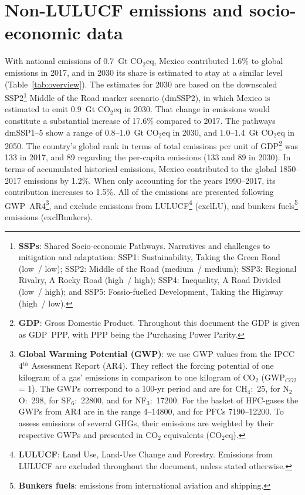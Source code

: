 \documentclass[12pt]{article}
\begin{document}
 \section{Non-LULUCF emissions and socio-economic data}
 \label{sec:nonLULUCFSocioEco}
 With national emissions of 0.7~Gt CO$_2$eq, Mexico contributed 1.6\% to global emissions in 2017, and in 2030 its share is estimated to stay at a similar level (Table~\ref{tab:overview}).
 The estimates for 2030 are based on the downscaled SSP2\footnote{\textbf{SSPs}: Shared Socio-economic Pathways.
 Narratives and challenges to mitigation and adaptation: 
 SSP1: Sustainability, Taking the Green Road (low~/ low);
 SSP2: Middle of the Road (medium~/ medium);
 SSP3: Regional Rivalry, A Rocky Road (high~/ high);
 SSP4: Inequality, A Road Divided (low~/ high); and
 SSP5: Fossio-fuelled Development, Taking the Highway (high~/ low).} Middle of the Road marker scenario (dmSSP2), in which Mexico is estimated to emit 0.9~Gt CO$_2$eq in 2030.
 That change in emissions would constitute a substantial increase of 17.6\% compared to 2017. 
 The pathways dmSSP1--5 show a range of 0.8--1.0~Gt CO$_2$eq in 2030, and 1.0--1.4~Gt CO$_2$eq in 2050.
 The country's global rank in terms of total emissions per unit of GDP\footnote{\textbf{GDP}: Gross Domestic Product. 
 Throughout this document the GDP is given as GDP~PPP, with PPP being the Purchasing Power Parity.} was 133 in 2017, and 89 regarding the per-capita emissions (133 and 89 in 2030).
 In terms of accumulated historical emissions, Mexico contributed to the global 1850--2017 emissions by 1.2\%. 
 When only accounting for the years 1990--2017, its contribution increases to 1.5\%.
 All of the emissions are presented following GWP~AR4\footnote{\textbf{Global Warming Potential (GWP)}: we use GWP values from the IPCC 4$^{th}$ Assessment Report (AR4). 
 They reflect the forcing potential of one kilogram of a gas' emissions in comparison to one kilogram of CO$_2$ (GWP$_{CO2}$ = 1). 
 The GWPs correspond to a 100-yr period and are for CH$_4$:~25, for N$_2$O:~298, for SF$_6$:~22800, and for NF$_3$:~17200. 
 For the basket of HFC-gases the GWPs from AR4 are in the range 4--14800, and for PFCs 7190--12200. 
 To assess emissions of several GHGs, their emissions are weighted by their respective GWPs and presented in CO$_2$ equivalents (CO$_2$eq).}, and exclude emissions from LULUCF\footnote{\textbf{LULUCF}: Land Use, Land-Use Change and Forestry. 
 Emissions from LULUCF are excluded throughout the document, unless stated otherwise.} (exclLU), and bunkers fuels\footnote{\textbf{Bunkers fuels}: emissions from international aviation and shipping.} emissions (exclBunkers).
\end{document}
